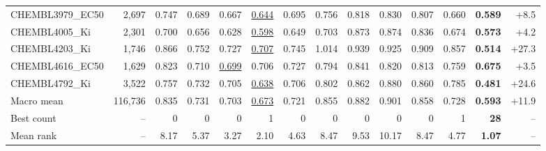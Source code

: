 \begin{table}[t]
{\begin{tabular}{lrrrrrrrrrrrrr}
CHEMBL3979\_EC50 & 2,697 & 0.747 & 0.689 & 0.667 & \underline{0.644} & 0.695 & 0.756 & 0.818 & 0.830 & 0.807 & 0.660 & \textbf{0.589} & +8.5\\
CHEMBL4005\_Ki & 2,301 & 0.700 & 0.656 & 0.628 & \underline{0.598} & 0.649 & 0.703 & 0.873 & 0.874 & 0.836 & 0.674 & \textbf{0.573} & +4.2\\
CHEMBL4203\_Ki & 1,746 & 0.866 & 0.752 & 0.727 & \underline{0.707} & 0.745 & 1.014 & 0.939 & 0.925 & 0.909 & 0.857 & \textbf{0.514} & +27.3\\
CHEMBL4616\_EC50 & 1,629 & 0.823 & 0.710 & \underline{0.699} & 0.706 & 0.727 & 0.794 & 0.841 & 0.820 & 0.813 & 0.759 & \textbf{0.675} & +3.5\\
CHEMBL4792\_Ki & 3,522 & 0.757 & 0.732 & 0.705 & \underline{0.638} & 0.706 & 0.802 & 0.862 & 0.880 & 0.860 & 0.785 & \textbf{0.481} & +24.6\\
\midrule
Macro mean & 116,736 & 0.835 & 0.731 & 0.703 & \underline{0.673} & 0.721 & 0.855 & 0.882 & 0.901 & 0.858 & 0.728 & \textbf{0.593} & +11.9\\
Best count & -- & 0 & 0 & 0 & 1 & 0 & 0 & 0 & 0 & 0 & 1 & \textbf{28} & --\\
Mean rank & -- & 8.17 & 5.37 & 3.27 & 2.10 & 4.63 & 8.47 & 9.53 & 10.17 & 8.47 & 4.77 & \textbf{1.07} & --\\
\bottomrule
\end{tabular}
}
\end{table}
